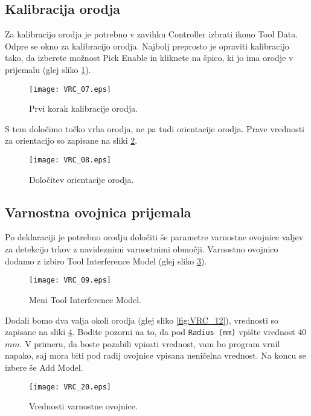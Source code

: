 \subsection*{Kalibracija orodja}

Za kalibracijo orodja je potrebno v zavihku Controller izbrati ikono Tool Data. Odpre se okno za kalibracijo orodja. Najbolj preprosto je opraviti kalibracijo tako, da izberete možnost Pick Enable in kliknete na špico, ki jo ima orodje v prijemalu (glej sliko \ref{fig:VRC_07}).

\begin{figure}[hbt]
	\centering
	\texttt{[image: VRC\_07.eps]}
	\caption{Prvi korak kalibracije orodja.}
	\label{fig:VRC_07}
\end{figure}

 S tem določimo točko vrha orodja, ne pa tudi orientacije orodja. Prave vrednosti za orientacijo so zapisane na sliki \ref{fig:VRC_08}.
 
\begin{figure}[hbt]
	\centering
	\texttt{[image: VRC\_08.eps]}
	\caption{Določitev orientacije orodja.}
	\label{fig:VRC_08}
\end{figure}

\subsection*{Varnostna ovojnica prijemala}

Po deklaraciji je potrebno orodju določiti še parametre varnostne ovojnice valjev za detekcijo trkov z navideznimi varnostnimi območji. Varnostno ovojnico dodamo z izbiro Tool Interference Model (glej sliko \ref{fig:VRC_09}).

\begin{figure}[hbt]
	\centering
	\texttt{[image: VRC\_09.eps]}
	\caption{Meni Tool Interference Model.}
	\label{fig:VRC_09}
\end{figure}

Dodali bomo dva valja okoli orodja (glej sliko \ref{fig:VRC_12}), vrednosti so zapisane na sliki \ref{fig:VRC_10}. Bodite pozorni na to, da pod \verb|Radius (mm)| vpište vrednost $40$ $mm$. V primeru, da boste pozabili vpisati vrednost, vam bo program vrnil napako, saj mora biti pod radij ovojnice vpisana neničelna vrednost. Na koncu se izbere še Add Model.

\begin{figure}[hbt]
	\centering
	\texttt{[image: VRC\_20.eps]}
	\caption{Vrednosti varnostne ovojnice.}
	\label{fig:VRC_10}
\end{figure}

